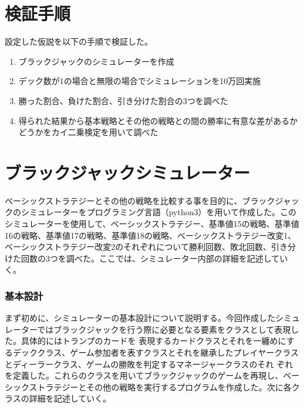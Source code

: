 \section{検証手順}
設定した仮説を以下の手順で検証した。
\begin{enumerate}
\item ブラックジャックのシミュレーターを作成
\item デック数が1の場合と無限の場合でシミュレーションを10万回実施
\item 勝った割合、負けた割合、引き分けた割合の3つを調べた
\item 得られた結果から基本戦略とその他の戦略との間の勝率に有意な差があるかどうかをカイ二乗検定を用いて調べた
\end{enumerate}

\section{ブラックジャックシミュレーター}
ベーシックストラテジーとその他の戦略を比較する事を目的に、ブラックジャックのシミュレーターをプログラミング言語（python3）を用いて作成した。このシミュレーターを使用して、ベーシックストラテジー、基準値15の戦略、基準値16の戦略、基準値17の戦略、基準値18の戦略、ベーシックストラテジー改変1、ベーシックストラテジー改変2のそれぞれについて勝利回数、敗北回数、引き分けた回数の3つを調べた。ここでは、シミュレーター内部の詳細を記述していく。



\subsubsection{基本設計}
まず初めに、シミュレーターの基本設計について説明する。今回作成したシミュレーターではブラックジャックを行う際に必要となる要素をクラスとして表現した。具体的にはトランプのカードを
表現するカードクラスとそれを一纏めにするデッククラス、ゲーム参加者を表すクラスとそれを継承したプレイヤークラスとディーラークラス、ゲームの勝敗を判定するマネージャークラスのそれ
ぞれを定義した。これらのクラスを用いてブラックジャックのゲームを再現し、ベーシックストラテジーとその他の戦略を実行するプログラムを作成した。次に各クラスの詳細を記述していく。

